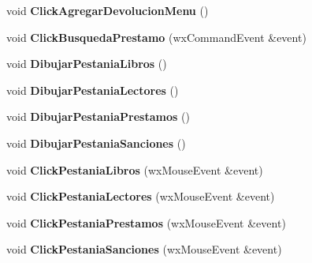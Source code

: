 \begin{DoxyCompactItemize}
\item 
void {\bfseries Click\+Agregar\+Devolucion\+Menu} ()\hypertarget{class_vprincipal_ae2472540ba2cfc008c7bea94e8c46da2}{}\label{class_vprincipal_ae2472540ba2cfc008c7bea94e8c46da2}

\item 
void {\bfseries Click\+Busqueda\+Prestamo} (wx\+Command\+Event \&event)\hypertarget{class_vprincipal_aeb20628f120b31509dc47937eabde165}{}\label{class_vprincipal_aeb20628f120b31509dc47937eabde165}

\item 
void {\bfseries Dibujar\+Pestania\+Libros} ()\hypertarget{class_vprincipal_afea83d672b1d6efe401fdde91c80561c}{}\label{class_vprincipal_afea83d672b1d6efe401fdde91c80561c}

\item 
void {\bfseries Dibujar\+Pestania\+Lectores} ()\hypertarget{class_vprincipal_ae3d56f1218d97426a4a4ec7ddb15259f}{}\label{class_vprincipal_ae3d56f1218d97426a4a4ec7ddb15259f}

\item 
void {\bfseries Dibujar\+Pestania\+Prestamos} ()\hypertarget{class_vprincipal_aa3c9e704305bc2b949ba1f647af9ffd7}{}\label{class_vprincipal_aa3c9e704305bc2b949ba1f647af9ffd7}

\item 
void {\bfseries Dibujar\+Pestania\+Sanciones} ()\hypertarget{class_vprincipal_ab1d4694a60c998f71a3ada8eea7242e1}{}\label{class_vprincipal_ab1d4694a60c998f71a3ada8eea7242e1}

\item 
void {\bfseries Click\+Pestania\+Libros} (wx\+Mouse\+Event \&event)\hypertarget{class_vprincipal_a2d085ef9f663abb6dbf0314c17a3ea85}{}\label{class_vprincipal_a2d085ef9f663abb6dbf0314c17a3ea85}

\item 
void {\bfseries Click\+Pestania\+Lectores} (wx\+Mouse\+Event \&event)\hypertarget{class_vprincipal_ade324748a590c34e56d0f375bf1d636d}{}\label{class_vprincipal_ade324748a590c34e56d0f375bf1d636d}

\item 
void {\bfseries Click\+Pestania\+Prestamos} (wx\+Mouse\+Event \&event)\hypertarget{class_vprincipal_a570fffff0663d3c0fad971c8fc226431}{}\label{class_vprincipal_a570fffff0663d3c0fad971c8fc226431}

\item 
void {\bfseries Click\+Pestania\+Sanciones} (wx\+Mouse\+Event \&event)\hypertarget{class_vprincipal_ac8a2d448620f2a64c5b24de04659e762}{}\label{class_vprincipal_ac8a2d448620f2a64c5b24de04659e762}


\end{DoxyCompactItemize}
